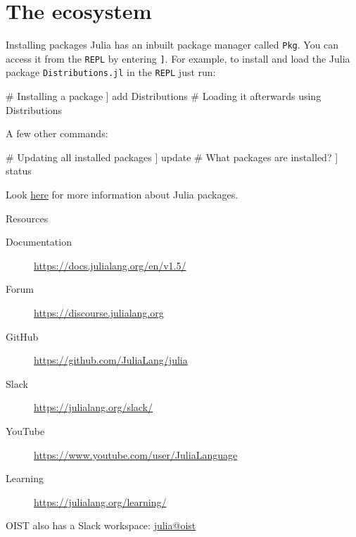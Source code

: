 \documentclass{beamer}
\newenvironment{Boxx}{\begin{tcolorbox}[standard jigsaw, opacityframe=0.8, opacityback=0.0]}{\end{tcolorbox}}
\begin{document}
\section{The ecosystem}
\begin{frame}[fragile]{Installing packages}
  Julia has an inbuilt package manager called \verb|Pkg|. You can access it from the \verb|REPL| by entering \verb|]|.
  For example, to install and load the Julia package \verb|Distributions.jl| in the \verb|REPL| just run:
\begin{Boxx}
  \begin{jllisting}
  # Installing a package
  ] add Distributions
  # Loading it afterwards
  using Distributions
  \end{jllisting}
\end{Boxx}
  A few other commands:
  \begin{Boxx}
  \begin{jllisting}
  # Updating all installed packages
  ] update
  # What packages are installed?
  ] status
  \end{jllisting}
\end{Boxx}
  Look \href{https://julialang.org/packages/}{\color{blue} here} for more information about Julia packages.
\end{frame}
\begin{frame}{Resources}
\begin{description}
	\item[Documentation] \url{https://docs.julialang.org/en/v1.5/}
	\item[Forum] \url{https://discourse.julialang.org}
	\item[GitHub] \url{https://github.com/JuliaLang/julia}
	\item[Slack] \url{https://julialang.org/slack/}
	\item[YouTube] \url{https://www.youtube.com/user/JuliaLanguage}
	\item[Learning] \url{https://julialang.org/learning/}
\end{description}
\vfill
OIST also has a Slack workspace: \href{https://join.slack.com/t/juliaoist/shared_invite/zt-n6apctg0-QEfCvMEFrldPtcn_2NztrQ}{\color{blue} julia@oist}
\end{frame}
\end{document}
